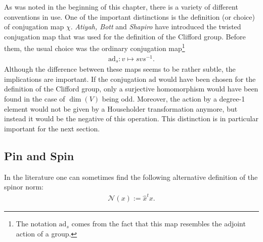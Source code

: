     \begin{remark}
        As was noted in the beginning of this chapter, there is a variety of different conventions in use. One of the important distinctions is the definition (or choice) of conjugation map $\chi$. \textit{Atiyah, Bott} and \textit{Shapiro} have introduced the twisted conjugation map that was used for the definition of the Clifford group. Before them, the usual choice was the ordinary conjugation map\footnote{The notation $\mathrm{ad}_s$ comes from the fact that this map resembles the adjoint action of a group.}
        \begin{gather}
            \mathrm{ad}_s:v\mapsto svs^{-1}.
        \end{gather}
        Although the difference between these maps seems to be rather subtle, the implications are important. If the conjugation $\mathrm{ad}$ would have been chosen for the definition of the Clifford group, only a surjective homomorphism would have been found in the case of $\dim(V)$ being odd. Moreover, the action by a degree-1 element would not be given by a Householder transformation anymore, but instead it would be the negative of this operation. This distinction is in particular important for the next section.
    \end{remark}

\subsection{Pin and Spin}\label{section:spin}

    \begin{remark}
        In the literature one can sometimes find the following alternative definition of the spinor norm:
        \begin{gather}
            \mathcal{N}(x) := \hat{x}^tx.
        \end{gather}
    \end{remark}

